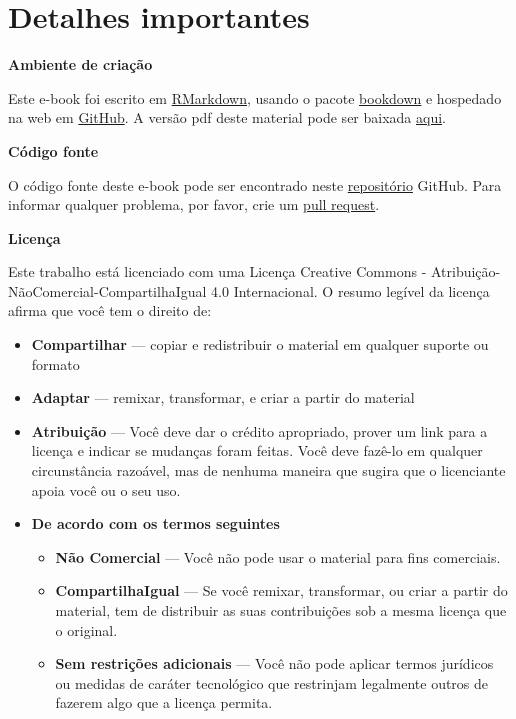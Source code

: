 \documentclass[
]{book}
\begin{document}
\hypertarget{detalhes-importantes}{%
\chapter*{Detalhes importantes}\label{detalhes-importantes}}

\textbf{Ambiente de criação}

Este e-book foi escrito em \href{https://rmarkdown.rstudio.com/}{RMarkdown}, usando o pacote \href{https://bookdown.org/yihui/bookdown/}{bookdown} e hospedado na web em \href{https://tiagoolivoto.github.io/e-bookr/}{GitHub}. A versão pdf deste material pode ser baixada \href{https://github.com/TiagoOlivoto/e-bookr/raw/master/data/pdf_r.pdf}{aqui}.

\textbf{Código fonte}

O código fonte deste e-book pode ser encontrado neste \href{https://github.com/TiagoOlivoto/e-bookr}{repositório} GitHub. Para informar qualquer problema, por favor, crie um \href{https://github.com/TiagoOlivoto/e-bookr/pulls}{pull request}.

\textbf{Licença}

Este trabalho está licenciado com uma Licença Creative Commons - Atribuição-NãoComercial-CompartilhaIgual 4.0 Internacional. O resumo legível da licença afirma que você tem o direito de:

\begin{itemize}
\item
  \textbf{Compartilhar} --- copiar e redistribuir o material em qualquer suporte ou formato
\item
  \textbf{Adaptar} --- remixar, transformar, e criar a partir do material
\item
  \textbf{Atribuição} --- Você deve dar o crédito apropriado, prover um link para a licença e indicar se mudanças foram feitas. Você deve fazê-lo em qualquer circunstância razoável, mas de nenhuma maneira que sugira que o licenciante apoia você ou o seu uso.
\item
  \textbf{De acordo com os termos seguintes}

  \begin{itemize}
  \item
    \textbf{Não Comercial} --- Você não pode usar o material para fins comerciais.
  \item
    \textbf{CompartilhaIgual} --- Se você remixar, transformar, ou criar a partir do material, tem de distribuir as suas contribuições sob a mesma licença que o original.
  \item
    \textbf{Sem restrições adicionais} --- Você não pode aplicar termos jurídicos ou medidas de caráter tecnológico que restrinjam legalmente outros de fazerem algo que a licença permita.
  \end{itemize}
\end{itemize}
\end{document}
